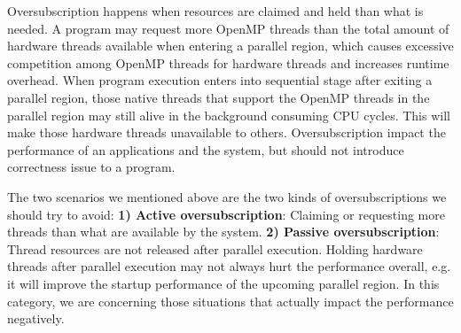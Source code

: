 Oversubscription happens when resources are claimed and held than what is needed.
A program may request more OpenMP threads than the total amount of hardware
threads available when entering a parallel region, which causes excessive competition 
among OpenMP threads for hardware threads and increases runtime overhead. 
When program execution enters into sequential stage after exiting a parallel region, 
those native threads that support the OpenMP threads in the parallel region may still 
alive in the background consuming CPU cycles. This 
will make those hardware threads unavailable to others. 
Oversubscription impact the performance of an applications and the system, 
but should not introduce correctness issue to a program. 


The two scenarios we mentioned above are the two kinds of oversubscriptions we should try to avoid:
{\bf 1) Active oversubscription}: Claiming or requesting more threads than 
what are available by the system.
{\bf 2) Passive oversubscription}: Thread resources are not released 
after parallel execution. Holding hardware threads after parallel execution may not 
always hurt the performance overall, e.g. it will improve the startup performance of the 
upcoming parallel region. In this category, we are concerning those situations that 
actually impact the performance negatively.

